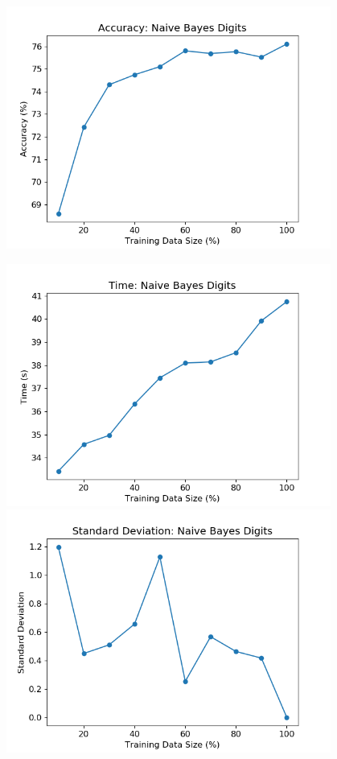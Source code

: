 \documentclass{article}
\begin{document}
\includegraphics[width=0.8\textwidth,height=0.8\textheight,keepaspectratio]{n_d.png}

\includegraphics[width=0.8\textwidth,height=0.8\textheight,keepaspectratio]{n_d-t.png}\\

\includegraphics[width=0.8\textwidth,height=0.8\textheight,keepaspectratio]{std_nd.png}
\end{document}
